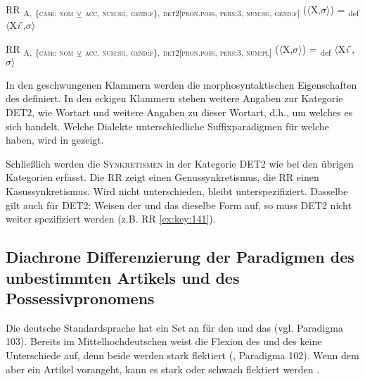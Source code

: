 \ea%
\label{ex:key:142}
 RR \textsubscript{A,} \textsubscript{\{\textsc{case:} \textsc{nom}} \textsubscript{\tiny $\veebar$}\textsubscript{ \textsc{acc}}\textsubscript{, \textsc{num:sg}, \textsc{gend:f}\},} \textsubscript{\textsc{det2[pron.poss}, \textsc{pers:3}, \textsc{num:sg}, \textsc{gend:f}]} ($\langle$X,$\sigma$$\rangle$) = \textsubscript{def} $\langle$X\textit{i}ˊ,$\sigma$$\rangle$
\z

\ea%
\label{ex:key:143}
 RR \textsubscript{A,} \textsubscript{\{\textsc{case:} \textsc{nom}} \textsubscript{\tiny $\veebar$}\textsubscript{ \textsc{acc}}\textsubscript{, \textsc{num:sg}, \textsc{gend:f}\},} \textsubscript{\textsc{det2[pron.poss}, \textsc{pers:3}, \textsc{num:pl}]} ($\langle$X,$\sigma$$\rangle$) = \textsubscript{def} $\langle$X\textit{i}ˊ,$\sigma$$\rangle$
\z

In den geschwungenen Klammern werden die morphosyntaktischen Eigenschaften des  definiert. In den eckigen Klammern stehen weitere Angaben zur Kategorie DET2, wie Wortart und weitere Angaben zu dieser Wortart, d.h., um welches  es sich handelt. Welche Dialekte unterschiedliche Suffixparadigmen für welche  haben, wird in  gezeigt.

Schließlich werden die \textsc{Synkretismen} in der Kategorie DET2 wie bei den übrigen Kategorien erfasst. Die RR  zeigt einen Genussynkretismus, die RR  einen Kasussynkretismus. Wird  nicht unterschieden, bleibt  unterspezifiziert. Dasselbe gilt auch für DET2: Weisen der  und das  dieselbe Form auf, so muss DET2 nicht weiter spezifiziert werden (z.B. RR \ref{ex:key:141}).

\subsection{Diachrone Differenzierung der Paradigmen des unbestimmten Artikels und des Possessivpronomens}\label{5.6.2}

Die deutsche Standardsprache hat ein Set an  für den  und das  (vgl. Paradigma 103). Bereits im Mittelhochdeutschen weist die Flexion des  und des  keine Unterschiede auf, denn beide werden stark flektiert (\citealt[216-217]{Paul2007}, Paradigma 102). Wenn dem  aber ein Artikel vorangeht, kann es stark oder schwach flektiert werden \citep[369]{Paul2007}.

